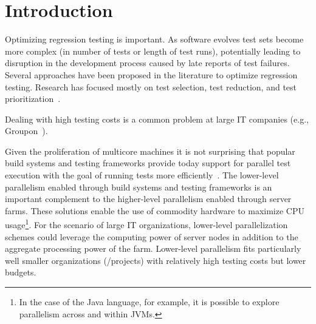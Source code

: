 \section{Introduction}

Optimizing regression testing is important.  As software evolves test
sets become more complex (in number of tests or length of test runs),
potentially leading to disruption in the development process caused by
late reports of test failures. Several approaches have been
proposed in the literature to optimize regression testing.  Research
has focused mostly on test selection, test reduction, and test
prioritization~.

Dealing with high testing costs is a common problem at large IT
companies (e.g., Groupon~\cite{kim-etal-fse2013}).  



Given the proliferation of multicore machines it is not surprising
that popular build systems and testing frameworks provide today
support for parallel test execution with the goal of running tests
more efficiently~\cite{junit-org,testng,nunit,maven-surefire-plugin}.
The lower-level parallelism enabled through build systems and testing
frameworks is an important complement to the higher-level parallelism
enabled through server farms.  These solutions enable the use of
commodity hardware to maximize CPU usage\footnote{In the case of the
Java language, for example, it is possible to explore parallelism
across and within JVMs.}.  For the scenario of large IT organizations,
lower-level parallelization schemes could leverage the computing power
of server nodes in addition to the aggregate processing power of the
farm.  Lower-level parallelism fits particularly well smaller
organizations (/projects) with relatively high testing costs but lower
budgets.  

